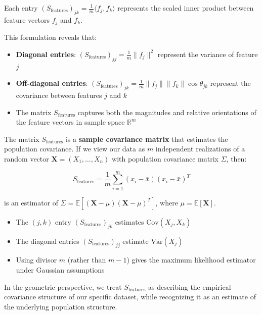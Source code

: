 \begin{notechapter}
\begin{remark}
Each entry $(S_{\text{features}})_{jk} = \frac{1}{m}\langle f_j, f_k \rangle$ represents the scaled inner product between feature vectors $f_j$ and $f_k$.
\end{remark}

\begin{remark}
This formulation reveals that:
\begin{itemize}
    \item \textbf{Diagonal entries}: $(S_{\text{features}})_{jj} = \frac{1}{m}\|f_j\|^2$ represent the variance of feature $j$
    \item \textbf{Off-diagonal entries}: $(S_{\text{features}})_{jk} = \frac{1}{m}\|f_j\|\|f_k\|\cos\theta_{jk}$ represent the covariance between features $j$ and $k$
    \item The matrix $S_{\text{features}}$ captures both the magnitudes and relative orientations of the feature vectors in sample space $\mathbb{R}^m$
\end{itemize}
\end{remark}

\begin{remark}
The matrix $S_{\text{features}}$ is a \textbf{sample covariance matrix} that estimates the population covariance. If we view our data as $m$ independent realizations of a random vector $\mathbf{X} = (X_1, \dots, X_n)$ with population covariance matrix $\Sigma$, then:

\[
S_{\text{features}} = \frac{1}{m}\sum_{i=1}^m (x_i - \bar{x})(x_i - \bar{x})^T
\]

is an estimator of $\Sigma = \mathbb{E}[(\mathbf{X} - \mu)(\mathbf{X} - \mu)^T]$, where $\mu = \mathbb{E}[\mathbf{X}]$.

\begin{itemize}
    \item The $(j,k)$ entry $(S_{\text{features}})_{jk}$ estimates $\text{Cov}(X_j, X_k)$
    \item The diagonal entries $(S_{\text{features}})_{jj}$ estimate $\text{Var}(X_j)$
    \item Using divisor $m$ (rather than $m-1$) gives the maximum likelihood estimator under Gaussian assumptions
\end{itemize}

In the geometric perspective, we treat $S_{\text{features}}$ as describing the empirical covariance structure of our specific dataset, while recognizing it as an estimate of the underlying population structure.
\end{remark}


\end{notechapter}
